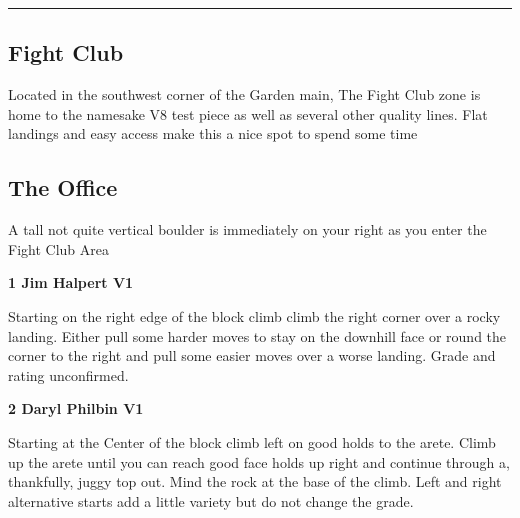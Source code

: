 \rule{\textwidth}{1pt}
\begin{multicols}{2}
		\section{Fight Club}\label{sa:Fight Club}
	\begin{minipage}{\columnwidth}
	Located in the southwest corner of the Garden main, The Fight Club zone is home to the namesake V8 test piece as well as several other quality lines. Flat landings and easy access make this a nice spot to spend some time
	\end{minipage}

			\subsection*{The Office}\label{bf:The Office}
			\begin{minipage}{\columnwidth}
			A tall not quite vertical boulder is immediately on your right as you enter the Fight Club Area
			\end{minipage}
			
					\begin{minipage}{\linewidth}	
					\label{rt:Jim Halpert}\colorbox{green!20}{\textbf{1 Jim Halpert V1  \warn \warn }}
					\begin{adjustwidth}{0.5cm}{}				
					Starting on the right edge of the block climb climb the right corner over a rocky landing. Either pull some harder moves to stay on the downhill face or round the corner to the right and pull some easier moves over a worse landing. Grade and rating unconfirmed.
					\end{adjustwidth}
					\end{minipage}

					\begin{minipage}{\linewidth}	
					\label{rt:Daryl Philbin}\colorbox{green!20}{\textbf{2 Daryl Philbin V1 \ding{72}    \warn }}
					\begin{adjustwidth}{0.5cm}{}				
					Starting at the Center of the block climb left on good holds to the arete. Climb up the arete until you can reach good face holds up right and continue through a, thankfully, juggy top out. Mind the rock at the base of the climb. Left and right alternative starts add a little variety but do not change the grade.
					\end{adjustwidth}
					\end{minipage}

\end{multicols}
